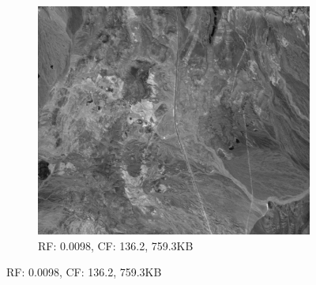 \begin{figure}[]
\begin{subfigure}{\textwidth}
  \includegraphics[scale=0.55]{images/example_compression_Cuprite_0_01.png}
  \caption{RF: 0.0098, CF: 136.2, 759.3KB}
\end{subfigure}
\end{figure}
